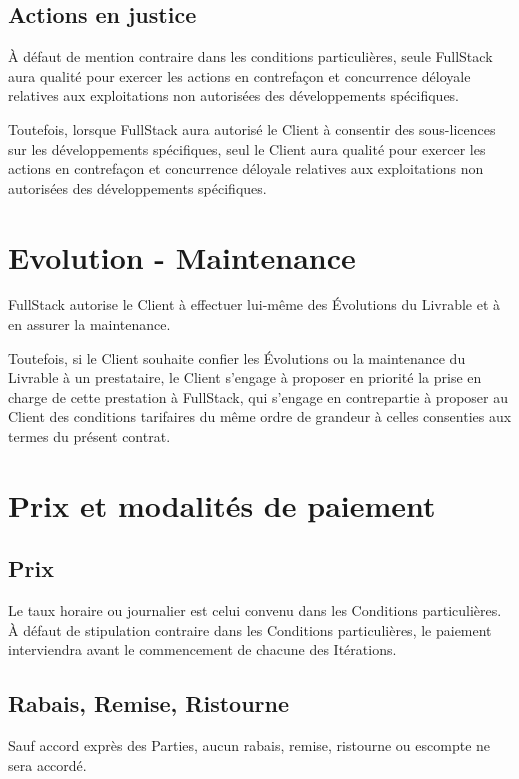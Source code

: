 \documentclass[11pt]{article}
\begin{document}
\subsection{Actions en justice}

À défaut de mention contraire dans les conditions particulières, seule FullStack aura qualité pour exercer les actions en contrefaçon et concurrence déloyale relatives aux exploitations non autorisées des développements spécifiques.

Toutefois, lorsque FullStack aura autorisé le Client à consentir des sous-licences sur les développements spécifiques, seul le Client aura qualité pour exercer les actions en contrefaçon et concurrence déloyale relatives aux exploitations non autorisées des développements spécifiques.

\section{Evolution - Maintenance}

FullStack autorise le Client à effectuer lui-même des Évolutions du Livrable et à en assurer la maintenance.

Toutefois, si le Client souhaite confier les Évolutions ou la maintenance du Livrable à un prestataire, le Client s’engage à proposer en priorité la prise en charge de cette prestation à FullStack, qui s’engage en contrepartie à proposer au Client des conditions tarifaires du même ordre de grandeur à celles consenties aux termes du présent contrat.


\section{Prix et modalités de paiement}

\subsection{Prix}

Le taux horaire ou journalier est celui convenu dans les Conditions particulières.
À défaut de stipulation contraire dans les Conditions particulières, le paiement interviendra avant le commencement de chacune des Itérations.

\subsection{Rabais, Remise, Ristourne}

Sauf accord exprès des Parties, aucun rabais, remise, ristourne ou escompte ne sera accordé.
\end{document}
